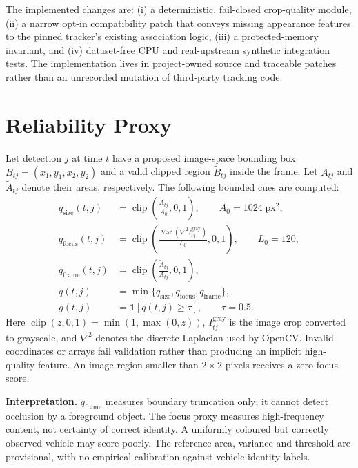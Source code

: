 \documentclass[11pt,a4paper]{article}
\begin{document}
The implemented changes are: (i) a deterministic, fail-closed crop-quality module, (ii) a narrow opt-in compatibility patch that conveys missing appearance features to the pinned tracker's existing association logic, (iii) a protected-memory invariant, and (iv) dataset-free CPU and real-upstream synthetic integration tests. The implementation lives in project-owned source and traceable patches rather than an unrecorded mutation of third-party tracking code.

\section{Reliability Proxy}
Let detection $j$ at time $t$ have a proposed image-space bounding box $B_{tj}=(x_1,y_1,x_2,y_2)$ and a valid clipped region $\widetilde B_{tj}$ inside the frame. Let $A_{tj}$ and $\widetilde A_{tj}$ denote their areas, respectively. The following bounded cues are computed:
\begin{align}
q_{\mathrm{size}}(t,j) &= \operatorname{clip}\!\left(\frac{\widetilde A_{tj}}{A_0},0,1\right), \qquad A_0=1024\;\mathrm{px}^2, \\[-1pt]
q_{\mathrm{focus}}(t,j) &= \operatorname{clip}\!\left(\frac{\operatorname{Var}(\nabla^2 I_{tj}^{\mathrm{gray}})}{L_0},0,1\right), \qquad L_0=120, \\
q_{\mathrm{frame}}(t,j) &= \operatorname{clip}\!\left(\frac{\widetilde A_{tj}}{A_{tj}},0,1\right), \\
q(t,j) &= \min\{q_{\mathrm{size}},q_{\mathrm{focus}},q_{\mathrm{frame}}\}, \\
g(t,j) &= \mathbf{1}[q(t,j)\ge \tau], \qquad \tau=0.5.
\label{eq:quality}
\end{align}
Here $\operatorname{clip}(z,0,1)=\min(1,\max(0,z))$, $I_{tj}^{\mathrm{gray}}$ is the image crop converted to grayscale, and $\nabla^2$ denotes the discrete Laplacian used by OpenCV. Invalid coordinates or arrays fail validation rather than producing an implicit high-quality feature. An image region smaller than $2\!\times\!2$ pixels receives a zero focus score.

\textbf{Interpretation.} $q_{\mathrm{frame}}$ measures boundary truncation only; it cannot detect occlusion by a foreground object. The focus proxy measures high-frequency content, not certainty of correct identity. A uniformly coloured but correctly observed vehicle may score poorly. The reference area, variance and threshold are provisional, with no empirical calibration against vehicle identity labels.
\end{document}
